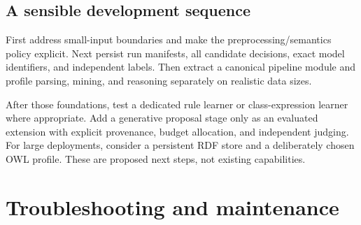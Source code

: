 \documentclass[11pt,a4paper]{article}
\begin{document}
\subsection{A sensible development sequence}
First address small-input boundaries and make the preprocessing/semantics policy
explicit. Next persist run manifests, all candidate decisions, exact model
identifiers, and independent labels. Then extract a canonical pipeline module
and profile parsing, mining, and reasoning separately on realistic data sizes.

After those foundations, test a dedicated rule learner or class-expression
learner where appropriate. Add a generative proposal stage only as an evaluated
extension with explicit provenance, budget allocation, and independent judging.
For large deployments, consider a persistent RDF store and a deliberately chosen
OWL profile. These are proposed next steps, not existing capabilities.

\section{Troubleshooting and maintenance}\label{sec:troubleshooting}
\end{document}
